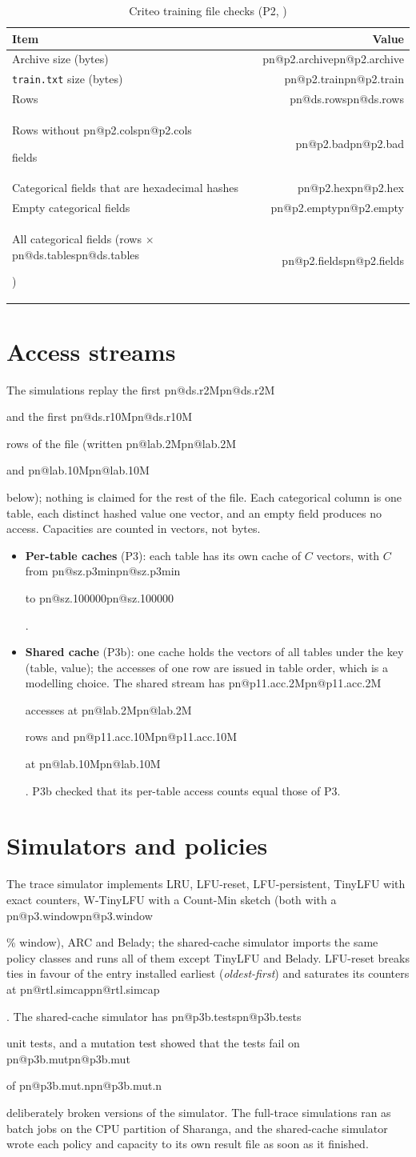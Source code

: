 \documentclass[11pt,a4paper]{report}
\makeatletter
\DeclareRobustCommand{\R}[1]{\ifcsname pn@#1\endcsname\csname pn@#1\endcsname\else
  \PackageError{report}{number key '#1' is not defined in macros.tex}{Run tools/make_paper_macros.py --target report}\fi}
\makeatother
\begin{document}
\begin{table}[ht]
\centering
\caption{Criteo training file checks (P2, \protect{})}
\label{tab:p2}
\begin{tabular}{@{}lr@{}}
\toprule
Item & Value \\
\midrule
Archive size (bytes) & \R{p2.archive} \\
\texttt{train.txt} size (bytes) & \R{p2.train} \\
Rows & \R{ds.rows} \\
Rows without \R{p2.cols} fields & \R{p2.bad} \\
Categorical fields that are hexadecimal hashes & \R{p2.hex} \\
Empty categorical fields & \R{p2.empty} \\
All categorical fields (rows $\times$ \R{ds.tables}) & \R{p2.fields} \\
\bottomrule
\end{tabular}
\end{table}

\section{Access streams}
The simulations replay the first \R{ds.r2M} and the first \R{ds.r10M} rows of the file (written \R{lab.2M} and
\R{lab.10M} below); nothing is claimed for the rest of the file. Each categorical column is one table, each distinct
hashed value one vector, and an empty field produces no access. Capacities are counted in vectors, not bytes.
\begin{itemize}
\item \textbf{Per-table caches} (P3): each table has its own cache of $C$ vectors, with $C$ from \R{sz.p3min} to
\R{sz.100000}.
\item \textbf{Shared cache} (P3b): one cache holds the vectors of all tables under the key (table, value); the
accesses of one row are issued in table order, which is a modelling choice. The shared stream has \R{p11.acc.2M}
accesses at \R{lab.2M} rows and \R{p11.acc.10M} at \R{lab.10M}. P3b checked that its per-table access counts equal
those of P3.
\end{itemize}

\section{Simulators and policies}
The trace simulator implements LRU, LFU-reset, LFU-persistent, TinyLFU with exact counters, W-TinyLFU with a
Count-Min sketch (both with a \R{p3.window}\% window), ARC and Belady; the shared-cache simulator imports the same
policy classes and runs all of them except TinyLFU and Belady. LFU-reset breaks ties in favour of the entry installed
earliest (\emph{oldest-first}) and saturates its counters at \R{rtl.simcap}. The shared-cache simulator has
\R{p3b.tests} unit tests, and a mutation test showed that the tests fail on \R{p3b.mut} of \R{p3b.mut.n} deliberately broken versions of the simulator. The full-trace simulations ran as batch jobs on the CPU partition of Sharanga, and the shared-cache simulator wrote each policy and capacity to its own result file as soon as it finished.
\end{document}
